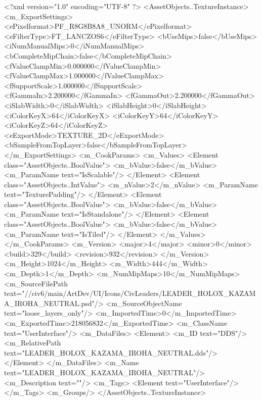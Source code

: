 <?xml version="1.0" encoding="UTF-8" ?>
<AssetObjects..TextureInstance>
	<m_ExportSettings>
		<ePixelformat>PF_R8G8B8A8_UNORM</ePixelformat>
		<eFilterType>FT_LANCZOS6</eFilterType>
		<bUseMips>false</bUseMips>
		<iNumManualMips>0</iNumManualMips>
		<bCompleteMipChain>false</bCompleteMipChain>
		<fValueClampMin>0.000000</fValueClampMin>
		<fValueClampMax>1.000000</fValueClampMax>
		<fSupportScale>1.000000</fSupportScale>
		<fGammaIn>2.200000</fGammaIn>
		<fGammaOut>2.200000</fGammaOut>
		<iSlabWidth>0</iSlabWidth>
		<iSlabHeight>0</iSlabHeight>
		<iColorKeyX>64</iColorKeyX>
		<iColorKeyY>64</iColorKeyY>
		<iColorKeyZ>64</iColorKeyZ>
		<eExportMode>TEXTURE_2D</eExportMode>
		<bSampleFromTopLayer>false</bSampleFromTopLayer>
	</m_ExportSettings>
	<m_CookParams>
		<m_Values>
			<Element class="AssetObjects..BoolValue">
				<m_bValue>false</m_bValue>
				<m_ParamName text="IsScalable"/>
			</Element>
			<Element class="AssetObjects..IntValue">
				<m_nValue>2</m_nValue>
				<m_ParamName text="TexturePadding"/>
			</Element>
			<Element class="AssetObjects..BoolValue">
				<m_bValue>false</m_bValue>
				<m_ParamName text="IsStandalone"/>
			</Element>
			<Element class="AssetObjects..BoolValue">
				<m_bValue>false</m_bValue>
				<m_ParamName text="IsTiled"/>
			</Element>
		</m_Values>
	</m_CookParams>
	<m_Version>
		<major>4</major>
		<minor>0</minor>
		<build>329</build>
		<revision>932</revision>
	</m_Version>
	<m_Height>1024</m_Height>
	<m_Width>444</m_Width>
	<m_Depth>1</m_Depth>
	<m_NumMipMaps>10</m_NumMipMaps>
	<m_SourceFilePath text="//civ6/main/ArtDev/UI/Icons/CivLeaders/LEADER_HOLOX_KAZAMA_IROHA_NEUTRAL.psd"/>
	<m_SourceObjectName text="loose_layers_only"/>
	<m_ImportedTime>0</m_ImportedTime>
	<m_ExportedTime>218056832</m_ExportedTime>
	<m_ClassName text="UserInterface"/>
	<m_DataFiles>
		<Element>
			<m_ID text="DDS"/>
			<m_RelativePath text="LEADER_HOLOX_KAZAMA_IROHA_NEUTRAL.dds"/>
		</Element>
	</m_DataFiles>
	<m_Name text="LEADER_HOLOX_KAZAMA_IROHA_NEUTRAL"/>
	<m_Description text=""/>
	<m_Tags>
		<Element text="UserInterface"/>
	</m_Tags>
	<m_Groups/>
</AssetObjects..TextureInstance>

